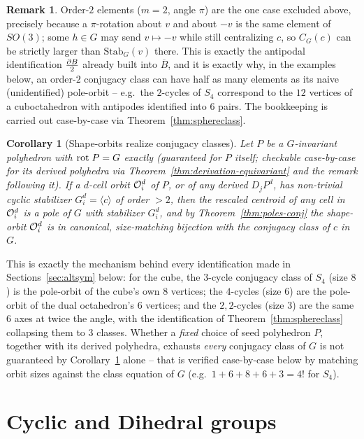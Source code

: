 \documentclass{amsart}
\theoremstyle{plain}
\newtheorem{corollary}[theorem]{Corollary}
\theoremstyle{definition}
\newtheorem*{remark}{Remark}
\begin{document}
\begin{remark}
    Order-$2$ elements ($m=2$, angle $\pi$) are the one case excluded above, precisely because a $\pi$-rotation about $v$ and about $-v$ is the same element of $SO(3)$; some $h\in G$ may send $v\mapsto -v$ while still centralizing $c$, so $C_G(c)$ can be strictly larger than $\mathrm{Stab}_G(v)$ there. This is exactly the antipodal identification $\frac{\partial B}{2}$ already built into $\overline B$, and it is exactly why, in the examples below, an order-$2$ conjugacy class can have half as many elements as its naive (unidentified) pole-orbit -- e.g.\ the $2$-cycles of $S_4$ correspond to the $12$ vertices of a cuboctahedron with antipodes identified into $6$ pairs. The bookkeeping is carried out case-by-case via Theorem~\ref{thm:sphereclass}.
\end{remark}
\begin{corollary}[Shape-orbits realize conjugacy classes]\label{cor:shape-conj}
    Let $P$ be a $G$-invariant polyhedron with $\mathrm{rot}\hspace{1mm}P=G$ exactly (guaranteed for $P$ itself; checkable case-by-case for its derived polyhedra via Theorem~\ref{thm:derivation-equivariant} and the remark following it). If a $d$-cell orbit $\mathcal{O}^d_i$ of $P$, or of any derived $D_jP^d$, has non-trivial cyclic stabilizer $G^d_i=\langle c\rangle$ of order $>2$, then the rescaled centroid of any cell in $\mathcal{O}^d_i$ is a pole of $G$ with stabilizer $G^d_i$, and by Theorem~\ref{thm:poles-conj} the shape-orbit $\mathcal{O}^d_i$ is in canonical, size-matching bijection with the conjugacy class of $c$ in $G$.
\end{corollary}
This is exactly the mechanism behind every identification made in Sections~\ref{sec:altsym} below: for the cube, the $3$-cycle conjugacy class of $S_4$ (size $8$) is the pole-orbit of the cube's own $8$ vertices; the $4$-cycles (size $6$) are the pole-orbit of the dual octahedron's $6$ vertices; and the $2,2$-cycles (size $3$) are the same $6$ axes at twice the angle, with the identification of Theorem~\ref{thm:sphereclass} collapsing them to $3$ classes. Whether a \emph{fixed} choice of seed polyhedron $P$, together with its derived polyhedra, exhausts \emph{every} conjugacy class of $G$ is not guaranteed by Corollary~\ref{cor:shape-conj} alone -- that is verified case-by-case below by matching orbit sizes against the class equation of $G$ (e.g.\ $1+6+8+6+3=4!$ for $S_4$).
 
\section{Cyclic and Dihedral groups}
\end{document}
